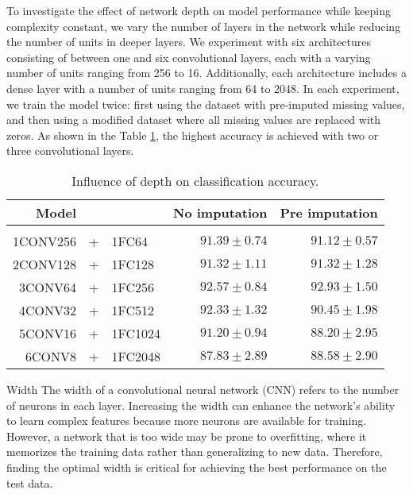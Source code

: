 To investigate the effect of network depth on model performance while keeping complexity constant, we vary the number of layers in the network while reducing the number of units in deeper layers.
We experiment with six architectures consisting of between one and six convolutional layers, each with a varying number of units ranging from 256 to 16.
Additionally, each architecture includes a dense layer with a number of units ranging from 64 to 2048. 
In each experiment, we train the model twice: first using the dataset with pre-imputed missing values, and then using a modified dataset where all missing values are replaced with zeros.
As shown in the Table \ref{tab:temCNNdepth}, the highest accuracy is achieved with two or three convolutional layers.

\begin{table}[H]
  \centering
   \begin{tabular}{rclrr}
   Model&&                  & No imputation         & Pre imputation             \\[0.2cm]
   \hline \\[-0.2cm]
   1CONV256 &+& 1FC64   	 & $91.39 \pm 0.74$ 	 & $91.12 \pm 0.57$\\
   2CONV128 &+& 1FC128  	 & $91.32 \pm 1.11$ 	 & $91.32 \pm 1.28$\\
   3CONV64 &+& 1FC256   	 & $\mathbf{92.57 \pm 0.84}$ 	 & $\mathbf{92.93 \pm 1.50}$\\
   4CONV32 &+& 1FC512   	 & $92.33 \pm 1.32$ 	 & $90.45 \pm 1.98$\\
   5CONV16 &+& 1FC1024  	 & $91.20 \pm 0.94$ 	 & $88.20 \pm 2.95$\\
   6CONV8 &+& 1FC2048   	 & $87.83 \pm 2.89$ 	 & $88.58 \pm 2.90$\\
   \end{tabular}
   \caption{Influence of depth on classification accuracy.}
   \label{tab:temCNNdepth}
 \end{table}

\begin{paragraph}{Width}
The width of a convolutional neural network (CNN) refers to the number of neurons in each layer.
Increasing the width can enhance the network's ability to learn complex features because more neurons are available for training.
However, a network that is too wide may be prone to overfitting, where it memorizes the training data rather than generalizing to new data.
Therefore, finding the optimal width is critical for achieving the best performance on the test data.
\end{paragraph}

